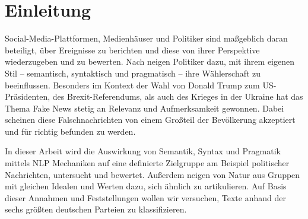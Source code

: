 
\chapter{Einleitung} \label{ch:introduction}


Social-Media-Plattformen, Medienhäuser und Politiker sind maßgeblich daran beteiligt, über Ereignisse zu berichten und diese von ihrer Perspektive wiederzugeben und zu bewerten. Nach \textcite{willeke_soziale_2019} neigen Politiker dazu, mit ihrem eigenen Stil -- semantisch, syntaktisch und pragmatisch -- ihre Wählerschaft zu beeinflussen. Besonders im Kontext der Wahl von Donald Trump zum US-Präsidenten, des Brexit-Referendums, als auch des Krieges in der Ukraine hat das Thema Fake News stetig an Relevanz und Aufmerksamkeit gewonnen. Dabei scheinen diese Falschnachrichten von einem Großteil der Bevölkerung akzeptiert und für richtig befunden zu werden.

In dieser Arbeit wird die Auswirkung von Semantik, Syntax und Pragmatik mittels NLP Mechaniken auf eine definierte Zielgruppe am Beispiel politischer Nachrichten, untersucht und bewertet. Außerdem neigen von Natur aus Gruppen mit gleichen Idealen und Werten dazu, sich ähnlich zu artikulieren. Auf Basis dieser Annahmen und Feststellungen wollen wir versuchen, Texte anhand der sechs größten deutschen Parteien zu klassifizieren.




